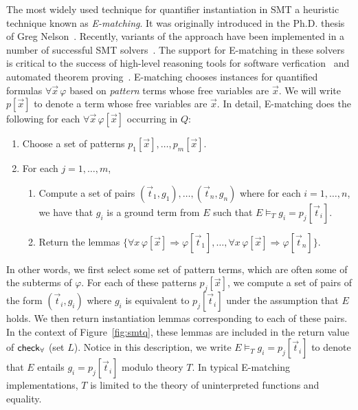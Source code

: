 \documentclass[oribibl]{llncs}
\begin{document}
The most widely used technique for quantifier instantiation in SMT a heuristic technique known as \emph{E-matching}.
It was originally introduced in the Ph.D. thesis of Greg Nelson~\cite{}.
Recently, variants of the approach have been implemented in a number of successful SMT solvers~\cite{}.
The support for E-matching in these solvers is critical to the success of high-level reasoning tools for 
software verfication~\cite{} and automated theorem proving~\cite{}.
E-matching chooses instances for quantified formulas $\forall \vec x\, \varphi$
based on \emph{pattern} terms whose free variables are $\vec x$.
We will write $p[ \vec x ]$ to denote a term whose free variables are $\vec x$.
In detail, 
E-matching does the following for each $\forall \vec x\, \varphi[ \vec x ]$ occurring in $Q$:
\begin{enumerate}
\item Choose a set of patterns $p_1[ \vec x ], \ldots, p_m[ \vec x ]$.
\item For each $j = 1, \ldots, m$,
\begin{enumerate}
\item Compute a set of pairs $(\vec t_{1},g_{1}), \ldots, (\vec t_{n}, g_{n})$ 
where for each $i = 1, \ldots, n$, we have that $g_i$ is a ground term from $E$ such that $E \models_T g_{i} = p_j[ \vec t_{i} ]$.
\item Return the lemmas $\{ \forall x\, \varphi[\vec x] \Rightarrow \varphi[\vec t_{1}], \ldots, \forall x\, \varphi[\vec x] \Rightarrow \varphi[\vec t_{n}] \}$.
\end{enumerate}
\end{enumerate}

In other words, we first select some set of pattern terms, which are often some of the subterms of $\varphi$.
For each of these patterns $p_j[ \vec x ]$, we compute a set of pairs of the form $( \vec t_i, g_i )$ where 
$g_i$ is equivalent to $p_j[ \vec t_i ]$ under the assumption that $E$ holds.
We then return instantiation lemmas corresponding to each of these pairs. 
In the context of Figure~\ref{fig:smtq}, these lemmas are included in the return value of $\small\mathsf{check}_\forall$ (set $L$).
Notice in this description, we write $E \models_T g_{i} = p_j[ \vec t_{i} ]$ to denote that $E$ entails
$g_{i} = p_j[ \vec t_{i} ]$ modulo theory $T$.  In typical E-matching implementations, $T$ is limited to the theory of uninterpreted functions and equality.
\end{document}
